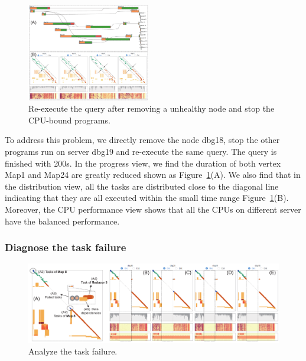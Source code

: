 \begin{figure}[t]
	\centering
	\includegraphics[width=0.48\textwidth]{figures/case_study/CaseStudy1.pdf}
	\vspace{-3mm}
	\caption{Re-execute the query after removing a unhealthy node and stop the CPU-bound programs.}
	\label{fig:casestudy1}
	\vspace{-3mm}
\end{figure}


To address this problem, we directly remove the node dbg18, stop the other programs run on server dbg19 and re-execute the same query. The query is finished with 200s. In the progress view, we find the duration of both vertex Map1 and Map24 are greatly reduced shown as Figure~\ref{fig:casestudy1}(A). We also find that in the distribution view, all the tasks are distributed close to the diagonal line indicating that they are all executed within the small time range Figure~\ref{fig:casestudy1}(B). Moreover, the CPU performance view shows that all the CPUs on different server have the balanced performance. 

\subsubsection{Diagnose the task failure}



\begin{figure}
	\vspace{2mm}
	\centering
	\small
	\includegraphics[width=2\columnwidth]{figures/case_study/CaseStudy2.pdf}  

	\caption{Analyze the task failure.} 
	\label{fig:casestudy2}

\end{figure}


